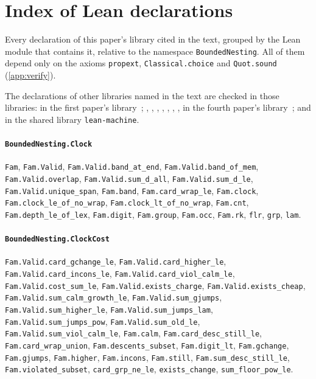 \section{Index of Lean declarations}\label{app:index}

Every declaration of this paper's library cited in the text, grouped by the Lean module that contains it, relative to the namespace
\texttt{BoundedNesting}. All of them depend only on the axioms \texttt{propext}, \texttt{Classical.choice} and
\texttt{Quot.sound} (\cref{app:verify}).
{\raggedright The declarations of other libraries named in the text are checked in those libraries:  in the first paper's library~\cite{FirstPaper2026}; , , , , , , ,  in the fourth paper's library~\cite{FourthPaper2026}; and  in the shared library \texttt{lean-machine}.\par}

\paragraph{\texttt{BoundedNesting.Clock}}
{\small\raggedright \texttt{Fam}, \texttt{Fam.Valid}, \texttt{Fam.Valid.band\_at\_end}, \texttt{Fam.Valid.band\_of\_mem}, \texttt{Fam.Valid.overlap}, \texttt{Fam.Valid.sum\_d\_all}, \texttt{Fam.Valid.sum\_d\_le}, \texttt{Fam.Valid.unique\_span}, \texttt{Fam.band}, \texttt{Fam.card\_wrap\_le}, \texttt{Fam.clock}, \texttt{Fam.clock\_le\_of\_no\_wrap}, \texttt{Fam.clock\_lt\_of\_no\_wrap}, \texttt{Fam.cnt}, \texttt{Fam.depth\_le\_of\_lex}, \texttt{Fam.digit}, \texttt{Fam.group}, \texttt{Fam.occ}, \texttt{Fam.rk}, \texttt{flr}, \texttt{grp}, \texttt{lam}.\par}

\paragraph{\texttt{BoundedNesting.ClockCost}}
{\small\raggedright \texttt{Fam.Valid.card\_gchange\_le}, \texttt{Fam.Valid.card\_higher\_le}, \texttt{Fam.Valid.card\_incons\_le}, \texttt{Fam.Valid.card\_viol\_calm\_le}, \texttt{Fam.Valid.cost\_sum\_le}, \texttt{Fam.Valid.exists\_charge}, \texttt{Fam.Valid.exists\_cheap}, \texttt{Fam.Valid.sum\_calm\_growth\_le}, \texttt{Fam.Valid.sum\_gjumps}, \texttt{Fam.Valid.sum\_higher\_le}, \texttt{Fam.Valid.sum\_jumps\_lam}, \texttt{Fam.Valid.sum\_jumps\_pow}, \texttt{Fam.Valid.sum\_old\_le}, \texttt{Fam.Valid.sum\_viol\_calm\_le}, \texttt{Fam.calm}, \texttt{Fam.card\_desc\_still\_le}, \texttt{Fam.card\_wrap\_union}, \texttt{Fam.descents\_subset}, \texttt{Fam.digit\_lt}, \texttt{Fam.gchange}, \texttt{Fam.gjumps}, \texttt{Fam.higher}, \texttt{Fam.incons}, \texttt{Fam.still}, \texttt{Fam.sum\_desc\_still\_le}, \texttt{Fam.violated\_subset}, \texttt{card\_grp\_ne\_le}, \texttt{exists\_change}, \texttt{sum\_floor\_pow\_le}.\par}

